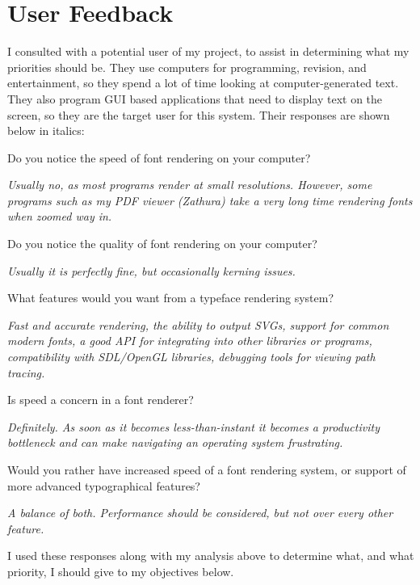 \documentclass{report}
\begin{document}
\section{User Feedback}

I consulted with a potential user of my project, to assist in determining what
my priorities should be. They use computers for programming, revision, and
entertainment, so they spend a lot of time looking at computer-generated text.
They also program GUI based applications that need to display text on the
screen, so they are the target user for this system.
Their responses are shown below in italics:

Do you notice the speed of font rendering on your computer?

\textit{Usually no, as most programs render at small resolutions. However, some
  programs such as my PDF viewer (Zathura) take a very long time rendering fonts
  when zoomed way in.}

Do you notice the quality of font rendering on your computer?

\textit{Usually it is perfectly fine, but occasionally kerning issues.}

What features would you want from a typeface rendering system?

\textit{Fast and accurate rendering, the ability to output SVGs, support for
  common modern fonts, a good API for integrating into other libraries or
  programs, compatibility with SDL/OpenGL libraries, debugging tools for viewing
  path tracing.}

Is speed a concern in a font renderer?

\textit{Definitely. As soon as it becomes less-than-instant it becomes a
  productivity bottleneck and can make navigating an operating system
  frustrating.}

Would you rather have increased speed of a font rendering system, or support of more advanced typographical features?

\textit{A balance of both. Performance should be considered, but not over every other feature.}

I used these responses along with my analysis above to determine what, and what
priority, I should give to my objectives below. 
\end{document}
